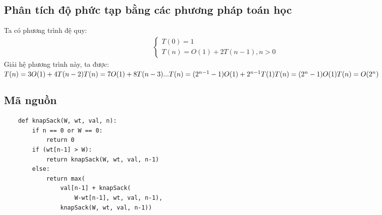 \documentclass[12pt,a4paper]{report}
\begin{document}
    \subsection{Phân tích độ phức tạp bằng các phương pháp toán học}
    Ta có phương trình đệ quy:
    \begin{align}
        \begin{cases}
            T(0) = 1 \\
            T(n) = O(1) + 2T(n-1), n>0 
        \end{cases}
    \end{align}
    Giải hệ phương trình này, ta được:\\
    \begin{math}
        T(n) = 3O(1) + 4T(n-2) \\
        T(n) = 7O(1) + 8T(n-3) \\ 
        ... \\
        T(n) = (2^{n-1} - 1)O(1) + 2^{n-1}T(1)\\
        T(n) = (2^n-1)O(1)\\
        T(n) = O(2^n)
    \end{math}
    
    \subsection{Mã nguồn}
    \begin{lstlisting}
    def knapSack(W, wt, val, n): 
        if n == 0 or W == 0: 
            return 0
        if (wt[n-1] > W): 
            return knapSack(W, wt, val, n-1) 
        else: 
            return max( 
                val[n-1] + knapSack( 
                    W-wt[n-1], wt, val, n-1), 
                knapSack(W, wt, val, n-1)) 
    \end{lstlisting}
\end{document}
